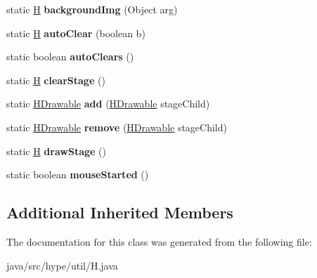 \begin{DoxyCompactItemize}
\item 
\hypertarget{classhype_1_1util_1_1_h_a52d44145dedccfdc092bab8a58e82117}{static \hyperlink{classhype_1_1util_1_1_h}{H} {\bfseries background\-Img} (Object arg)}\label{classhype_1_1util_1_1_h_a52d44145dedccfdc092bab8a58e82117}

\item 
\hypertarget{classhype_1_1util_1_1_h_a70d309725aff47fd409068afd9f98e6c}{static \hyperlink{classhype_1_1util_1_1_h}{H} {\bfseries auto\-Clear} (boolean b)}\label{classhype_1_1util_1_1_h_a70d309725aff47fd409068afd9f98e6c}

\item 
\hypertarget{classhype_1_1util_1_1_h_a36bc8f7fb28cad14d50c836f940ac821}{static boolean {\bfseries auto\-Clears} ()}\label{classhype_1_1util_1_1_h_a36bc8f7fb28cad14d50c836f940ac821}

\item 
\hypertarget{classhype_1_1util_1_1_h_a43a611cbbd42c6cb0577bff6c38ab710}{static \hyperlink{classhype_1_1util_1_1_h}{H} {\bfseries clear\-Stage} ()}\label{classhype_1_1util_1_1_h_a43a611cbbd42c6cb0577bff6c38ab710}

\item 
\hypertarget{classhype_1_1util_1_1_h_a3369a46149acaf9b543c5bafb438499e}{static \hyperlink{classhype_1_1drawable_1_1_h_drawable}{H\-Drawable} {\bfseries add} (\hyperlink{classhype_1_1drawable_1_1_h_drawable}{H\-Drawable} stage\-Child)}\label{classhype_1_1util_1_1_h_a3369a46149acaf9b543c5bafb438499e}

\item 
\hypertarget{classhype_1_1util_1_1_h_adc69ac14d009920ee93d1915d71f76c9}{static \hyperlink{classhype_1_1drawable_1_1_h_drawable}{H\-Drawable} {\bfseries remove} (\hyperlink{classhype_1_1drawable_1_1_h_drawable}{H\-Drawable} stage\-Child)}\label{classhype_1_1util_1_1_h_adc69ac14d009920ee93d1915d71f76c9}

\item 
\hypertarget{classhype_1_1util_1_1_h_a5a565f90bd0a25e12079af9b7cbc8138}{static \hyperlink{classhype_1_1util_1_1_h}{H} {\bfseries draw\-Stage} ()}\label{classhype_1_1util_1_1_h_a5a565f90bd0a25e12079af9b7cbc8138}

\item 
\hypertarget{classhype_1_1util_1_1_h_a2c6f5ff8a14884977bac3324592e1a60}{static boolean {\bfseries mouse\-Started} ()}\label{classhype_1_1util_1_1_h_a2c6f5ff8a14884977bac3324592e1a60}

\end{DoxyCompactItemize}
\subsection*{Additional Inherited Members}


The documentation for this class was generated from the following file\-:\begin{DoxyCompactItemize}
\item 
java/src/hype/util/H.\-java\end{DoxyCompactItemize}
